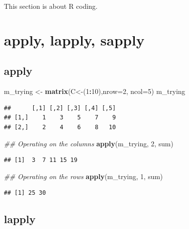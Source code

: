 \documentclass[]{book}
\newenvironment{Shaded}{\begin{snugshade}}{\end{snugshade}}
\newcommand{\CommentTok}[1]{\textcolor[rgb]{0.56,0.35,0.01}{\textit{#1}}}
\newcommand{\DataTypeTok}[1]{\textcolor[rgb]{0.13,0.29,0.53}{#1}}
\newcommand{\DecValTok}[1]{\textcolor[rgb]{0.00,0.00,0.81}{#1}}
\newcommand{\KeywordTok}[1]{\textcolor[rgb]{0.13,0.29,0.53}{\textbf{#1}}}
\newcommand{\NormalTok}[1]{#1}
\newcommand{\OperatorTok}[1]{\textcolor[rgb]{0.81,0.36,0.00}{\textbf{#1}}}
\newcommand{\StringTok}[1]{\textcolor[rgb]{0.31,0.60,0.02}{#1}}
\begin{document}
This section is about R coding.

\hypertarget{apply-lapply-sapply}{%
\section{apply, lapply, sapply}\label{apply-lapply-sapply}}

\hypertarget{apply}{%
\subsection{apply}\label{apply}}

\begin{Shaded}
\begin{Highlighting}[]
\NormalTok{m_trying <-}\StringTok{ }\KeywordTok{matrix}\NormalTok{(C<-(}\DecValTok{1}\OperatorTok{:}\DecValTok{10}\NormalTok{),}\DataTypeTok{nrow=}\DecValTok{2}\NormalTok{, }\DataTypeTok{ncol=}\DecValTok{5}\NormalTok{)}
\NormalTok{m_trying}
\end{Highlighting}
\end{Shaded}

\begin{verbatim}
##      [,1] [,2] [,3] [,4] [,5]
## [1,]    1    3    5    7    9
## [2,]    2    4    6    8   10
\end{verbatim}

\begin{Shaded}
\begin{Highlighting}[]
\CommentTok{## Operating on the columns}
\KeywordTok{apply}\NormalTok{(m_trying, }\DecValTok{2}\NormalTok{, sum)}
\end{Highlighting}
\end{Shaded}

\begin{verbatim}
## [1]  3  7 11 15 19
\end{verbatim}

\begin{Shaded}
\begin{Highlighting}[]
\CommentTok{## Operating on the rows}
\KeywordTok{apply}\NormalTok{(m_trying, }\DecValTok{1}\NormalTok{, sum)}
\end{Highlighting}
\end{Shaded}

\begin{verbatim}
## [1] 25 30
\end{verbatim}

\hypertarget{lapply}{%
\subsection{lapply}\label{lapply}}
\end{document}
